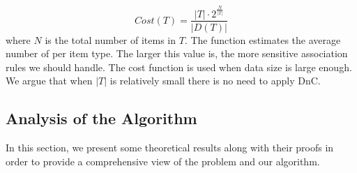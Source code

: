 \begin{equation}\label{eq:costfunc}
Cost(T)=\frac{|T|\cdot 2^{\frac{N}{|T|}}}{|D(T)|}
\end{equation}
where $N$ is the total number of items in $T$. The function estimates the
average number of \qids per item type. The larger this value is, the more
sensitive association rules we should handle. The cost function is used when
data size is large enough. We argue that when $|T|$ is relatively
small there is no need to apply DnC.

\subsection{Analysis of the Algorithm}
\label{sec:analysis}

%

In this section, we present some theoretical results along with their proofs
in order to provide a comprehensive view of the problem and our algorithm.

